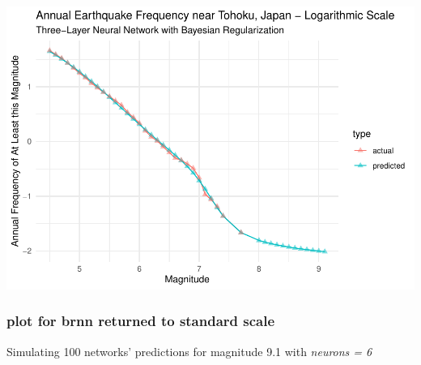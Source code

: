 \documentclass[
]{article}
\begin{document}
\includegraphics{earthquakes_files/figure-latex/unnamed-chunk-11-1.pdf}

\hypertarget{plot-for-brnn-returned-to-standard-scale}{%
\subsubsection{plot for brnn returned to standard
scale}\label{plot-for-brnn-returned-to-standard-scale}}

Simulating 100 networks' predictions for magnitude 9.1 with
\emph{neurons = 6}
\end{document}
